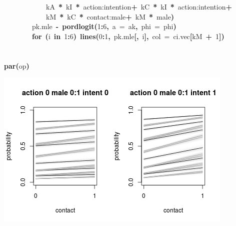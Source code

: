 \documentclass{article}
\makeatletter
\newcommand{\hlnumber}[1]{\textcolor[rgb]{0,0,0}{#1}}%
\newcommand{\hlfunctioncall}[1]{\textcolor[rgb]{.5,0,.33}{\textbf{#1}}}%
\newcommand{\hlkeyword}[1]{\textbf{#1}}%
\newcommand{\hlargument}[1]{\textcolor[rgb]{.69,.25,.02}{#1}}%
\newcommand{\hlassignement}[1]{\textbf{#1}}%
\newcommand{\hlsymbol}[1]{#1}%
\newcommand{\hlstd}[1]{\textcolor[rgb]{0,0,0}{#1}}%
\newenvironment{kframe}{%
 \def\FrameCommand##1{\hskip\@totalleftmargin \hskip-\fboxsep
 \colorbox{shadecolor}{##1}\hskip-\fboxsep
     \hskip-\linewidth \hskip-\@totalleftmargin \hskip\columnwidth}%
 \MakeFramed {\advance\hsize-\width
   \@totalleftmargin\z@ \linewidth\hsize
   \@setminipage}}%
 {\par\unskip\endMakeFramed}
\newenvironment{knitrout}{}{} %
\makeatother
\begin{document}
\begin{knitrout}
{\begin{kframe}
\begin{flushleft}
\hlstd{}{\ }{\ }{\ }{\ }{\ }{\ }{\ }{\ }{\ }{\ }{\ }{\ }\hlsymbol{kA}{\ }\hlkeyword{*}{\ }\hlsymbol{kI}{\ }\hlkeyword{*}{\ }\hlsymbol{\usebox{\hlnormalsizeboxbacktick}action:intention\usebox{\hlnormalsizeboxbacktick}}{\ }\hlkeyword{+}{\ }\hlsymbol{kC}{\ }\hlkeyword{*}{\ }\hlsymbol{kI}{\ }\hlkeyword{*}{\ }\hlsymbol{\usebox{\hlnormalsizeboxbacktick}action:intention\usebox{\hlnormalsizeboxbacktick}}{\ }\hlkeyword{+}\hspace*{\fill}\\
\hlstd{}{\ }{\ }{\ }{\ }{\ }{\ }{\ }{\ }{\ }{\ }{\ }{\ }\hlsymbol{kM}{\ }\hlkeyword{*}{\ }\hlsymbol{kC}{\ }\hlkeyword{*}{\ }\hlsymbol{\usebox{\hlnormalsizeboxbacktick}contact:male\usebox{\hlnormalsizeboxbacktick}}{\ }\hlkeyword{+}{\ }\hlsymbol{kM}{\ }\hlkeyword{*}{\ }\hlsymbol{male}\hlkeyword{)}\hspace*{\fill}\\
\hlstd{}{\ }{\ }{\ }{\ }{\ }{\ }{\ }{\ }\hlsymbol{pk.mle}{\ }\hlassignement{\usebox{\hlnormalsizeboxlessthan}-}{\ }\hlfunctioncall{pordlogit}\hlkeyword{(}\hlnumber{1}\hlkeyword{:}\hlnumber{6}\hlkeyword{,}{\ }\hlargument{a}{\ }\hlargument{=}{\ }\hlsymbol{ak}\hlkeyword{,}{\ }\hlargument{phi}{\ }\hlargument{=}{\ }\hlsymbol{phi}\hlkeyword{)}\hspace*{\fill}\\
\hlstd{}{\ }{\ }{\ }{\ }{\ }{\ }{\ }{\ }\hlkeyword{for}{\ }\hlkeyword{(}\hlsymbol{i}{\ }\hlkeyword{in}{\ }\hlnumber{1}\hlkeyword{:}\hlnumber{6}\hlkeyword{)}{\ }\hlfunctioncall{lines}\hlkeyword{(}\hlnumber{0}\hlkeyword{:}\hlnumber{1}\hlkeyword{,}{\ }\hlsymbol{pk.mle}\hlkeyword{[}\hlkeyword{,}{\ }\hlsymbol{i}\hlkeyword{]}\hlkeyword{,}{\ }\hlargument{col}{\ }\hlargument{=}{\ }\hlsymbol{ci.vec}\hlkeyword{[}\hlsymbol{kM}{\ }\hlkeyword{+}{\ }\hlnumber{1}\hlkeyword{]}\hlkeyword{)}\hspace*{\fill}\\
\hlstd{}{\ }{\ }{\ }{\ }\hlkeyword{\usebox{\hlnormalsizeboxclosebrace}}\hspace*{\fill}\\
\hlstd{}\hlkeyword{\usebox{\hlnormalsizeboxclosebrace}}\hspace*{\fill}\\
\hlstd{}\hlfunctioncall{par}\hlkeyword{(}\hlsymbol{op}\hlkeyword{)}\mbox{}
\normalfont
\end{flushleft}


\centering{}\includegraphics{trolley-plots} 


\end{kframe}}
\end{knitrout}
\end{document}
